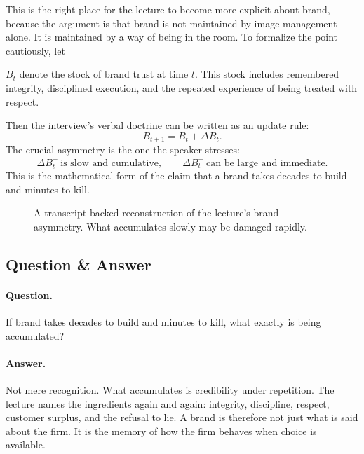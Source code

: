 This is the right place for the lecture to become more explicit about brand, because the argument is that brand is not maintained by image management alone. It is maintained by a way of being in the room. To formalize the point cautiously, let
\begin{definition}
\(B_t\) denote the stock of brand trust at time \(t\). This stock includes remembered integrity, disciplined execution, and the repeated experience of being treated with respect.
\end{definition}
Then the interview's verbal doctrine can be written as an update rule:
\begin{equation}
B_{t+1}=B_t+\Delta B_t.
\end{equation}
The crucial asymmetry is the one the speaker stresses:
\begin{equation}
\Delta B_t^{+}\ \text{is slow and cumulative},\qquad
\Delta B_t^{-}\ \text{can be large and immediate}.
\end{equation}
This is the mathematical form of the claim that a brand takes decades to build and minutes to kill.

\begin{figure}[h]
\centering
{}
\caption{A transcript-backed reconstruction of the lecture's brand asymmetry. What accumulates slowly may be damaged rapidly.}
\end{figure}

\subsection{Question \& Answer}

\paragraph{Question.}
If brand takes decades to build and minutes to kill, what exactly is being accumulated?

\paragraph{Answer.}
Not mere recognition. What accumulates is credibility under repetition. The lecture names the ingredients again and again: integrity, discipline, respect, customer surplus, and the refusal to lie. A brand is therefore not just what is said about the firm. It is the memory of how the firm behaves when choice is available.

